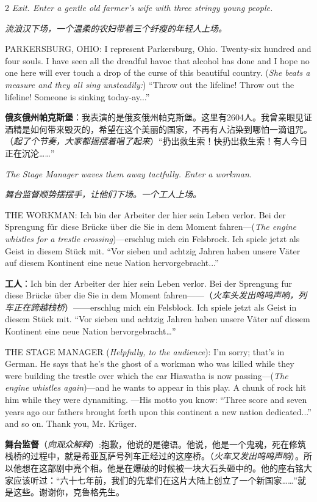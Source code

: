 \documentclass[lang=cn,newtx,10pt,scheme=chinese]{elegantbook}
\newcommand{\pair}[2]{%
\switchcolumn* #2\par
\switchcolumn  #1\par
}
\begin{document}
\begin{paracol}{2}
\pair{
    \textit{流浪汉下场，一个温柔的农妇带着三个纤瘦的年轻人上场。}
}{
    \textit{Exit. Enter a gentle old farmer's wife with three stringy young people.}
    \newline
    \newline
}

\pair{
    \textbf{俄亥俄州帕克斯堡}：我表演的是俄亥俄州帕克斯堡。这里有2604人。我曾亲眼见证酒精是如何带来毁灭的，希望在这个美丽的国家，不再有人沾染到哪怕一滴诅咒。（\textit{起了个节奏，大家都摇摆着唱了起来}）“扔出救生索！快扔出救生索！有人今日正在沉沦……”
}{
    PARKERSBURG, OHIO: I represent Parkersburg, Ohio. Twenty-six hundred and four souls. I have seen all the dreadful havoc that alcohol has done and I hope no one here will ever touch a drop of the curse of this beautiful country. (\textit{She beats a measure and they all sing unsteadily:}) “Throw out the lifeline! Throw out the lifeline! Someone is sinking today-ay...”
    \newline
    \newline
}

\pair{
    \textit{舞台监督顺势摆摆手，让他们下场。一个工人上场。}
}{
    \textit{The Stage Manager waves them away tactfully. Enter a workman.}
    \newline
    \newline
}

\pair{
    \textbf{工人}：Ich bin der Arbeiter der hier sein Leben verlor. Bei der Sprengung fur diese Brücke über die Sie in dem Moment fahren——（\textit{火车头发出呜呜声响，列车正在跨越栈桥}）——erschlug mich ein Felsblock. Ich spiele jetzt als Geist in diesem Stück mit. “Vor sieben und achtzig Jahren haben unsere Väter auf diesem Kontinent eine neue Nation hervorgebracht…”
}{
    THE WORKMAN: Ich bin der Arbeiter der hier sein Leben verlor. Bei der Sprengung für diese Brücke über die Sie in dem Moment fahren—(\textit{The engine whistles for a trestle crossing})—erschlug mich ein Felsbrock. Ich spiele jetzt als Geist in diesem Stück mit. “Vor sieben und achtzig Jahren haben unsere Väter auf diesem Kontinent eine neue Nation hervorgebracht...”
}

\pair{
    \textbf{舞台监督}（\textit{向观众解释}）:抱歉，他说的是德语。他说，他是一个鬼魂，死在修筑栈桥的过程中，就是希亚瓦萨号列车正经过的这座桥。（\textit{火车又发出呜呜声响}）。所以他想在这部剧中亮个相。他是在爆破的时候被一块大石头砸中的。他的座右铭大家应该听过：“六十七年前，我们的先辈们在这片大陆上创立了一个新国家……”就是这些。谢谢你，克鲁格先生。
}{
    THE STAGE MANAGER (\textit{Helpfully, to the audience}): I'm sorry; that's in German. He says that he's the ghost of a workman who was killed while they were building the trestle over which the car Hiawatha is now passing—(\textit{The engine whistles again})—and he wants to appear in this play. A chunk of rock hit him while they were dynamiting. —His motto you know: “Three score and seven years ago our fathers brought forth upon this continent a new nation dedicated...” and so on. Thank you, Mr. Krüger.
    \newline
    \newline
}


\end{paracol}
\end{document}
